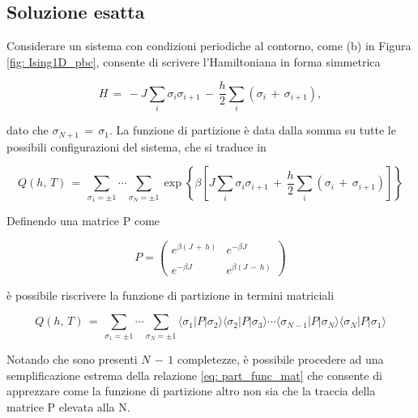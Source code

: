 \subsection{Soluzione esatta}

Considerare un sistema con condizioni periodiche al contorno, come (b) in Figura \ref{fig: Ising1D_pbc}, consente 
di scrivere l'Hamiltoniana in forma simmetrica 

\begin{equation}
    H\,=\,-J\sum_{i} \sigma_i \sigma_{i+1}\,-\,\frac{h}{2}\sum_{i} \left(\sigma_i\,+\,\sigma_{i+1}\right),
    \label{eq: ising_ham_sim}
\end{equation}

dato che $\sigma_{N+1}\,=\,\sigma_1$. La funzione di partizione è data dalla somma su tutte le possibili configurazioni del sistema, 
che si traduce in 

\begin{equation}
    Q\left(h,\,T\right)\,=\,\sum_{\sigma_1=\pm 1} \cdots \sum_{\sigma_N=\pm 1} \exp{\left\{\beta\left[J\sum_i \sigma_i \sigma_{i+1}\,+\,\frac{h}{2}\sum_i \left(\sigma_i\,+\,\sigma_{i+1}\right)\right]\right\}}
    \label{eq: part_func}
\end{equation}

Definendo una matrice P come

\begin{equation}
    P = \begin{pmatrix}
    e^{\beta\left(J\,+\,h\right)} & e^{-\beta J} \\\\
    e^{-\beta J} & e^{\beta\left(J\,-\,h\right)}
    \end{pmatrix}
    \label{eq: mat_P}
\end{equation}

è possibile riscrivere la funzione di partizione in termini matriciali

\begin{equation}
    Q\left(h,\,T\right)\,=\,\sum_{\sigma_1=\pm 1} \cdots \sum_{\sigma_N=\pm 1} \langle \sigma_1 | P | \sigma_2 \rangle \langle \sigma_2 | P | \sigma_3 \rangle \cdots \langle \sigma_{N-1} | P | \sigma_N \rangle \langle \sigma_N | P | \sigma_1 \rangle 
    \label{eq: part_func_mat}
\end{equation}

Notando che sono presenti $N\,-\,1$ completezze, è possibile procedere ad una semplificazione estrema della relazione 
\eqref{eq: part_func_mat} che consente di apprezzare come la funzione di partizione altro non sia che la traccia della matrice P 
elevata alla N. 

